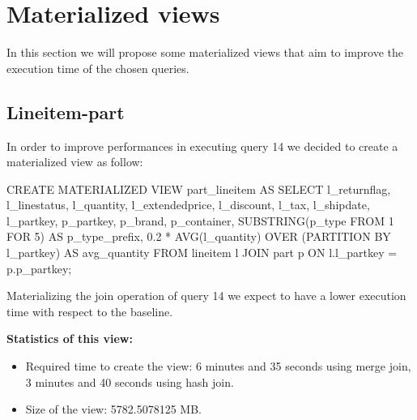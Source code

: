 \section{Materialized views}
In this section we will propose some materialized views that aim to improve the execution time of the chosen queries.
\subsection{Lineitem-part}
In order to improve performances in executing query 14 we decided to create a materialized view as follow:
\begin{sql}
CREATE MATERIALIZED VIEW part_lineitem AS
SELECT
    l_returnflag,
    l_linestatus,
    l_quantity,
    l_extendedprice,
    l_discount,
    l_tax,
    l_shipdate,
    l_partkey,
    p_partkey,
    p_brand,
    p_container,
    SUBSTRING(p_type FROM 1 FOR 5) AS p_type_prefix,
    0.2 * AVG(l_quantity) OVER (PARTITION BY l_partkey) AS avg_quantity
FROM
    lineitem l
JOIN
    part p ON l.l_partkey = p.p_partkey;
\end{sql}
Materializing the join operation of query 14 we expect to have a lower execution time with respect to the baseline.

\textbf{Statistics of this view:}
\begin{itemize}
    \item Required time to create the view: 6 minutes and 35 seconds 
            using merge join, 3 minutes and 40 seconds using hash join.
    \item Size of the view: 5782.5078125 MB.
            
\end{itemize}


